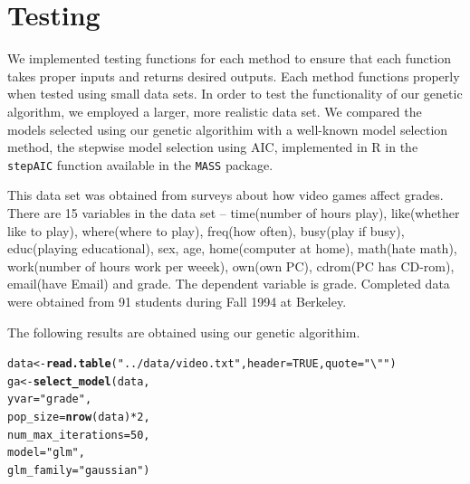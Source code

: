\documentclass{article}\usepackage[]{graphicx}\usepackage[]{color}
\makeatletter
\newcommand{\hlnum}[1]{\textcolor[rgb]{0.686,0.059,0.569}{#1}}%
\newcommand{\hlstr}[1]{\textcolor[rgb]{0.192,0.494,0.8}{#1}}%
\newcommand{\hlopt}[1]{\textcolor[rgb]{0,0,0}{#1}}%
\newcommand{\hlstd}[1]{\textcolor[rgb]{0.345,0.345,0.345}{#1}}%
\newcommand{\hlkwb}[1]{\textcolor[rgb]{0.69,0.353,0.396}{#1}}%
\newcommand{\hlkwc}[1]{\textcolor[rgb]{0.333,0.667,0.333}{#1}}%
\newcommand{\hlkwd}[1]{\textcolor[rgb]{0.737,0.353,0.396}{\textbf{#1}}}%
\newenvironment{kframe}{%
 \def\at@end@of@kframe{}%
 \ifinner\ifhmode%
  \def\at@end@of@kframe{\end{minipage}}%
  \begin{minipage}{\columnwidth}%
 \fi\fi%
 \def\FrameCommand##1{\hskip\@totalleftmargin \hskip-\fboxsep
 \colorbox{shadecolor}{##1}\hskip-\fboxsep
     \hskip-\linewidth \hskip-\@totalleftmargin \hskip\columnwidth}%
 \MakeFramed {\advance\hsize-\width
   \@totalleftmargin\z@ \linewidth\hsize
   \@setminipage}}%
 {\par\unskip\endMakeFramed%
 \at@end@of@kframe}
\newenvironment{knitrout}{}{} %
\makeatother
\begin{document}
\section{Testing}
We implemented testing functions for each method to ensure that each 
function takes proper inputs and returns desired outputs. Each method 
functions properly when tested using small data sets. In order to test the 
functionality of our genetic algorithm, we employed a larger, more realistic 
data set. We compared the models selected using our genetic algorithim with a 
well-known model selection method, the stepwise model selection using AIC, 
implemented in R in the \texttt{stepAIC} function available in the 
\texttt{MASS} package.

This data set was obtained from surveys about how video games 
affect grades. There are 15 variables in the data set -- time(number of hours play), like(whether like to play), where(where to play), freq(how often), busy(play if busy), educ(playing educational), sex, age, home(computer at home), math(hate math), work(number of hours work per weeek), own(own PC), cdrom(PC has CD-rom), email(have Email) and grade. The dependent variable is grade. Completed data were obtained from 91 students during Fall 1994 at Berkeley. 

The following results are obtained using our genetic algorithim.

\begin{knitrout}
\color{fgcolor}\begin{kframe}
\begin{alltt}
\hlstd{data} \hlkwb{<-} \hlkwd{read.table}\hlstd{(}\hlstr{"../data/video.txt"}\hlstd{,} \hlkwc{header} \hlstd{=} \hlnum{TRUE}\hlstd{,} \hlkwc{quote} \hlstd{=} \hlstr{"\textbackslash{}""}\hlstd{)}
\hlstd{ga} \hlkwb{<-} \hlkwd{select_model}\hlstd{(data,}
                   \hlkwc{yvar} \hlstd{=} \hlstr{"grade"}\hlstd{,}
                   \hlkwc{pop_size} \hlstd{=} \hlkwd{nrow}\hlstd{(data)}\hlopt{*}\hlnum{2}\hlstd{,}
                   \hlkwc{num_max_iterations} \hlstd{=} \hlnum{50}\hlstd{,}
                   \hlkwc{model} \hlstd{=} \hlstr{"glm"}\hlstd{,}
                   \hlkwc{glm_family} \hlstd{=} \hlstr{"gaussian"}\hlstd{)}
\end{alltt}
\end{kframe}
\end{knitrout}
\end{document}
